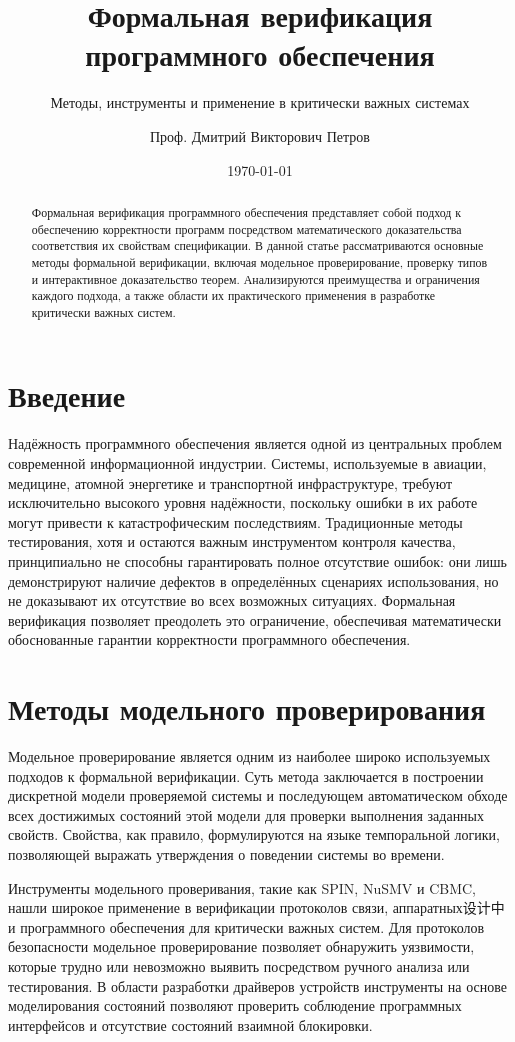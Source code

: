 \documentclass[
    language=russian,
    doctype=article,
]{../../omnilatex}
\title{Формальная верификация программного обеспечения}
\subtitle{Методы, инструменты и применение в критически важных системах}
\author{Проф. Дмитрий Викторович Петров}
\date{\today}
\begin{document}
\maketitle

\begin{abstract}
Формальная верификация программного обеспечения представляет собой подход к обеспечению корректности программ посредством математического доказательства соответствия их свойствам спецификации. В данной статье рассматриваются основные методы формальной верификации, включая модельное проверирование, проверку типов и интерактивное доказательство теорем. Анализируются преимущества и ограничения каждого подхода, а также области их практического применения в разработке критически важных систем.
\end{abstract}

\section{Введение}
Надёжность программного обеспечения является одной из центральных проблем современной информационной индустрии. Системы, используемые в авиации, медицине, атомной энергетике и транспортной инфраструктуре, требуют исключительно высокого уровня надёжности, поскольку ошибки в их работе могут привести к катастрофическим последствиям. Традиционные методы тестирования, хотя и остаются важным инструментом контроля качества, принципиально не способны гарантировать полное отсутствие ошибок: они лишь демонстрируют наличие дефектов в определённых сценариях использования, но не доказывают их отсутствие во всех возможных ситуациях. Формальная верификация позволяет преодолеть это ограничение, обеспечивая математически обоснованные гарантии корректности программного обеспечения.

\section{Методы модельного проверирования}
Модельное проверирование является одним из наиболее широко используемых подходов к формальной верификации. Суть метода заключается в построении дискретной модели проверяемой системы и последующем автоматическом обходе всех достижимых состояний этой модели для проверки выполнения заданных свойств. Свойства, как правило, формулируются на языке темпоральной логики, позволяющей выражать утверждения о поведении системы во времени.

Инструменты модельного проверивания, такие как SPIN, NuSMV и CBMC, нашли широкое применение в верификации протоколов связи, аппаратных设计中 и программного обеспечения для критически важных систем. Для протоколов безопасности модельное проверирование позволяет обнаружить уязвимости, которые трудно или невозможно выявить посредством ручного анализа или тестирования. В области разработки драйверов устройств инструменты на основе моделирования состояний позволяют проверить соблюдение программных интерфейсов и отсутствие состояний взаимной блокировки.
\end{document}
